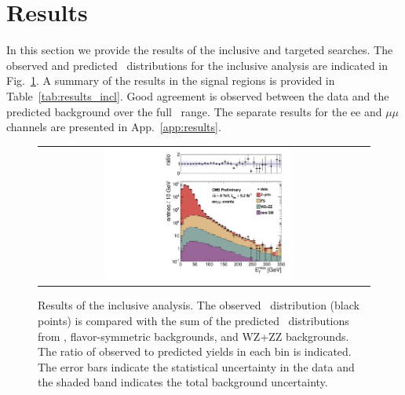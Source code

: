 \clearpage

\section{Results}

In this section we provide the results of the inclusive and targeted searches. 
The observed and predicted \MET\ distributions for the inclusive analysis are indicated in Fig.~\ref{fig:results_incl}. 
A summary of the results in the signal regions is provided in Table~\ref{tab:results_incl}. 
Good agreement is observed between the data and the predicted background over the full \MET\ range.
The separate results for the ee and $\mu\mu$ channels are presented in App.~\ref{app:results}.

\begin{figure}[!h]
\begin{center}
\begin{tabular}{cc}
\includegraphics[width=0.6\textwidth]{plots/pfmet_all.pdf}
\end{tabular}
\caption{Results of the inclusive analysis. The observed \MET\ distribution (black points) is compared with the sum of the predicted \MET\
distributions from \zjets, flavor-symmetric backgrounds, and WZ+ZZ backgrounds. The ratio of observed to predicted yields in each bin is
indicated. The error bars indicate the statistical uncertainty in the data and the shaded band indicates the total background uncertainty.
\label{fig:results_incl}
}
\end{center}
\end{figure}



